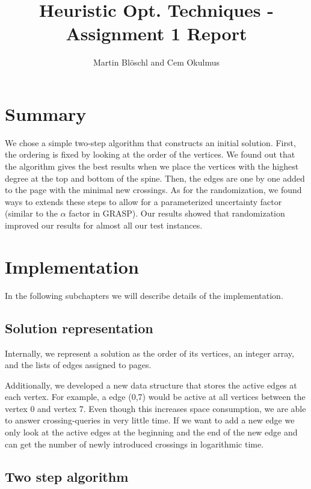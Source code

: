 \documentclass [11pt]{article}
\begin{document}
\title{ Heuristic Opt. Techniques - Assignment 1 Report}
\author{ Martin Blöschl and Cem Okulmus }

\maketitle
\thispagestyle{empty}

\section{Summary}
We chose a simple two-step algorithm that constructs an initial solution. First, the ordering is fixed by looking at the order of the vertices. We found out that the algorithm gives the best results when we place the vertices with the highest degree at the top and bottom of the spine. Then, the edges are one by one added to the page with the minimal new crossings.
 As for the randomization, we found ways to extends these steps to allow for a parameterized uncertainty factor (similar to the $\alpha$ factor in GRASP). 
Our results showed that randomization improved our results for almost all our test instances. 

\section{Implementation}

In the following subchapters we will describe details of the implementation.

\subsection{Solution representation}
Internally, we represent a solution as the order of its vertices, an integer array, and the lists of edges assigned to pages. 

Additionally, we developed a new data structure that stores the active edges at each vertex. For example, a edge (0,7) would be active at all vertices between the vertex 0 and vertex 7. Even though this increases space consumption, we are able to answer crossing-queries in very little time. If we want to add a new edge we only look at the active edges at the beginning and the end of the new edge and can get the number of newly introduced crossings in logarithmic time.

\subsection{Two step algorithm}
\end{document}
